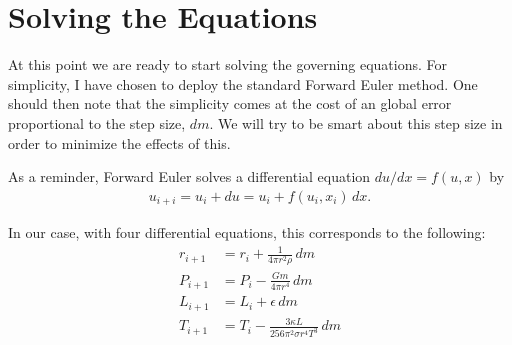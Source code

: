 \documentclass[11pt]{article}
\begin{document}
\section{Solving the Equations}
At this point we are ready to start solving the governing
equations. For simplicity, I have chosen to deploy the standard
Forward Euler method. One should then note that the simplicity comes
at the cost of an global error proportional to the step size, $dm$. We
will try to be smart about this step size in order to minimize the
effects of this. 

As a reminder, Forward Euler solves a differential equation $du/dx =
f(u,x)$ by 
\begin{align*}
  u_{i+i} = u_i + du = u_i + f(u_i,x_i)\,dx.
\end{align*}

In our case, with four differential equations, this corresponds to the
following:
\begin{align*}
  r_{i+1} &= r_i +  \frac{ 1 }{ 4\pi r^2\rho }\,dm\\
  P_{i+1} &= P_{i} - \frac{ Gm }{ 4\pi r^4 }\,dm\\
  L_{i+1} &= L_i + \epsilon\,dm\\
  T_{i+1} &= T_i - \frac{ 3\kappa L }{ 256 \pi^2 \sigma r^4T^3 }\,dm
\end{align*}



\printbibliography
\end{document}

